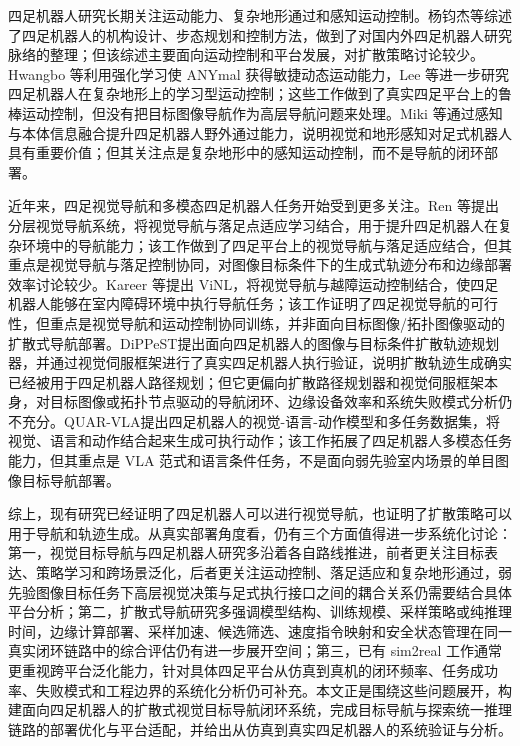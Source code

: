 四足机器人研究长期关注运动能力、复杂地形通过和感知运动控制。杨钧杰等\cite{yang2019quadruped_review}综述了四足机器人的机构设计、步态规划和控制方法，做到了对国内外四足机器人研究脉络的整理；但该综述主要面向运动控制和平台发展，对扩散策略讨论较少。Hwangbo 等\cite{hwangbo2019anymal}利用强化学习使 ANYmal 获得敏捷动态运动能力，Lee 等\cite{lee2020learning}进一步研究四足机器人在复杂地形上的学习型运动控制；这些工作做到了真实四足平台上的鲁棒运动控制，但没有把目标图像导航作为高层导航问题来处理。Miki 等\cite{miki2022perceptive}通过感知与本体信息融合提升四足机器人野外通过能力，说明视觉和地形感知对足式机器人具有重要价值；但其关注点是复杂地形中的感知运动控制，而不是导航的闭环部署。

近年来，四足视觉导航和多模态四足机器人任务开始受到更多关注。Ren 等\cite{ren2023hvn}提出分层视觉导航系统，将视觉导航与落足点适应学习结合，用于提升四足机器人在复杂环境中的导航能力；该工作做到了四足平台上的视觉导航与落足适应结合，但其重点是视觉导航与落足控制协同，对图像目标条件下的生成式轨迹分布和边缘部署效率讨论较少。Kareer 等\cite{kareer2023vinl}提出 ViNL，将视觉导航与越障运动控制结合，使四足机器人能够在室内障碍环境中执行导航任务；该工作证明了四足视觉导航的可行性，但重点是视觉导航和运动控制协同训练，并非面向目标图像/拓扑图像驱动的扩散式导航部署。DiPPeST\cite{dippest2024}提出面向四足机器人的图像与目标条件扩散轨迹规划器，并通过视觉伺服框架进行了真实四足机器人执行验证，说明扩散轨迹生成确实已经被用于四足机器人路径规划；但它更偏向扩散路径规划器和视觉伺服框架本身，对目标图像或拓扑节点驱动的导航闭环、边缘设备效率和系统失败模式分析仍不充分。QUAR-VLA\cite{quarvla2024}提出四足机器人的视觉-语言-动作模型和多任务数据集，将视觉、语言和动作结合起来生成可执行动作；该工作拓展了四足机器人多模态任务能力，但其重点是 VLA 范式和语言条件任务，不是面向弱先验室内场景的单目图像目标导航部署。

综上，现有研究已经证明了四足机器人可以进行视觉导航，也证明了扩散策略可以用于导航和轨迹生成。从真实部署角度看，仍有三个方面值得进一步系统化讨论：第一，视觉目标导航与四足机器人研究多沿着各自路线推进，前者更关注目标表达、策略学习和跨场景泛化，后者更关注运动控制、落足适应和复杂地形通过，弱先验图像目标任务下高层视觉决策与足式执行接口之间的耦合关系仍需要结合具体平台分析；第二，扩散式导航研究多强调模型结构、训练规模、采样策略或纯推理时间，边缘计算部署、采样加速、候选筛选、速度指令映射和安全状态管理在同一真实闭环链路中的综合评估仍有进一步展开空间；第三，已有 sim2real 工作通常更重视跨平台泛化能力，针对具体四足平台从仿真到真机的闭环频率、任务成功率、失败模式和工程边界的系统化分析仍可补充。本文正是围绕这些问题展开，构建面向四足机器人的扩散式视觉目标导航闭环系统，完成目标导航与探索统一推理链路的部署优化与平台适配，并给出从仿真到真实四足机器人的系统验证与分析。

